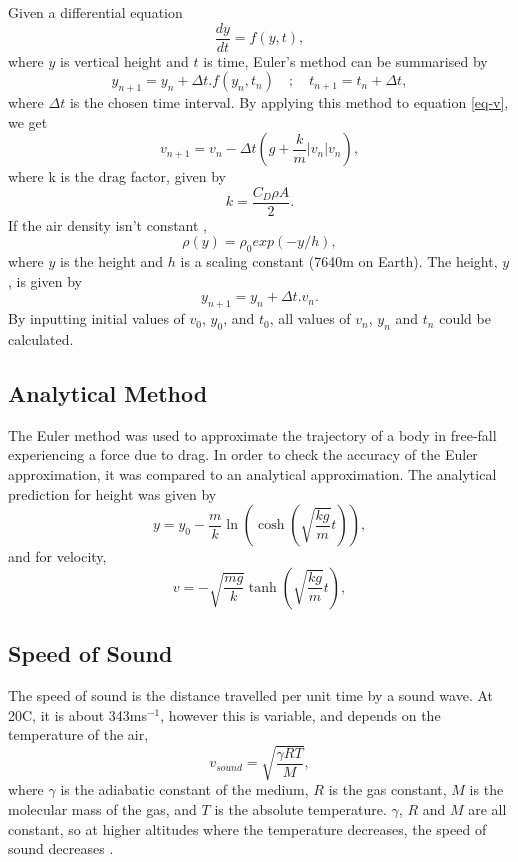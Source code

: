 \documentclass[twocolumn,prl,nobalancelastpage,aps,10pt]{revtex4-1}
\begin{document}
Given a differential equation
\begin{equation}
\frac{dy}{dt} = f(y,t),
\end{equation}
where $y$ is vertical height and $t$ is time, Euler's method can be summarised by
\begin{equation}
y_{n+1} = y_{n} + \Delta t.f(y_{n},t_{n})\quad;\quad t_{n+1} = t_{n} +\Delta t,
\end{equation}
where $\Delta t$ is the chosen time interval.
By applying this method to equation \ref{eq-v}, we get
\begin{equation}\label{eq-iterative-v}
v_{n+1} = v_{n} - \Delta t(g+\frac{k}{m}|v_{n}|v_{n}),
\end{equation}
where k is the drag factor, given by
\begin{equation}
k = \frac{C_{D}\rho A}{2}.
\end{equation}
If the air density isn't constant \cite{Mohazzabi1996},
\begin{equation}\label{eq-va-air-dens}
\rho(y)=\rho_{0}exp(-y/h),
\end{equation}
where $y$ is the height and $h$ is a scaling constant (7640m on Earth). The height, $y$, is given by
\begin{equation}\label{eq-iterative-y}
y_{n+1} = y_{n}+\Delta t.v_{n}.
\end{equation}
By inputting initial values of $v_{0}$, $y_{0}$, and $t_{0}$, all values of $v_{n}$, $y_{n}$ and $t_{n}$ could be calculated.
\subsection{Analytical Method}
The Euler method was used to approximate the trajectory of a body in free-fall experiencing a force due to drag. In order to check the accuracy of the Euler approximation, it was compared to an analytical approximation. The analytical prediction for height was given by
\begin{equation}
y = y_{0}-\frac{m}{k}\ln(\cosh(\sqrt{\frac{kg}{m}}t)),
\end{equation}
and for velocity,
\begin{equation}
v = -\sqrt{\frac{mg}{k}}\tanh(\sqrt{\frac{kg}{m}}t),
\end{equation}
\subsection{Speed of Sound}
The speed of sound is the distance travelled per unit time by a sound wave. At 20\degree C, it is about 343ms$^{-1}$, however this is variable, and depends on the temperature of the air,
\begin{equation}
v_{sound} = \sqrt{\frac{\gamma RT}{M}},
\end{equation}
where $\gamma$ is the adiabatic constant of the medium, $R$ is the gas constant, $M$ is the molecular mass of the gas, and $T$ is the absolute temperature. $\gamma$, $R$ and $M$ are all constant, so at higher altitudes where the temperature decreases, the speed of sound decreases \cite{Everest2001}.
\end{document}
